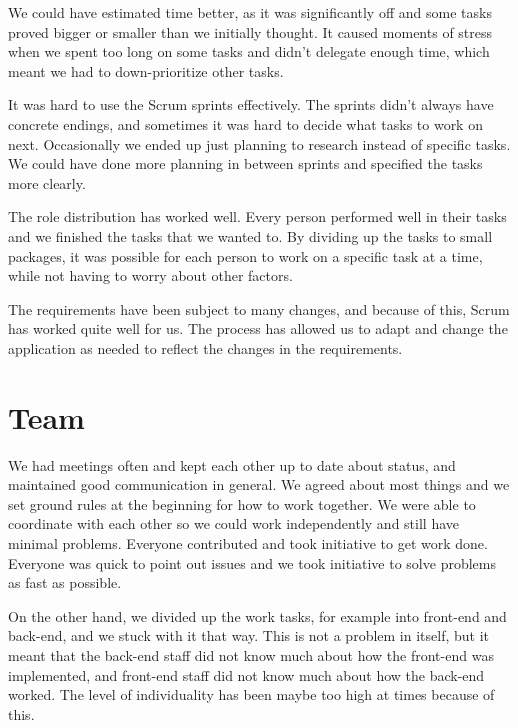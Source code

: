 We could have estimated time better, as it was significantly off and some tasks proved bigger or smaller than we initially thought. It caused moments of stress when we spent too long on some tasks and didn't delegate enough time, which meant we had to down-prioritize other tasks.\newline

It was hard to use the Scrum sprints effectively. The sprints didn't always have concrete endings, and sometimes it was hard to decide what tasks to work on next. Occasionally we ended up just planning to research instead of specific tasks. We could have done more planning in between sprints and specified the tasks more clearly.\newline

The role distribution has worked well. Every person performed well in their tasks and we finished the tasks that we wanted to. By dividing up the tasks to small packages, it was possible for each person to work on a specific task at a time, while not having to worry about other factors.\newline

The requirements have been subject to many changes, and because of this, Scrum has worked quite well for us. The process has allowed us to adapt and change the application as needed to reflect the changes in the requirements.

\section{Team}

We had meetings often and kept each other up to date about status, and maintained good communication in general. We agreed about most things and we set ground rules at the beginning for how to work together. We were able to coordinate with each other so we could work independently and still have minimal problems. Everyone contributed and took initiative to get work done. Everyone was quick to point out issues and we took initiative to solve problems as fast as possible.\newline

On the other hand, we divided up the work tasks, for example into front-end and back-end, and we stuck with it that way. This is not a problem in itself, but it meant that the back-end staff did not know much about how the front-end was implemented, and front-end staff did not know much about how the back-end worked. The level of individuality has been maybe too high at times because of this.\newline


